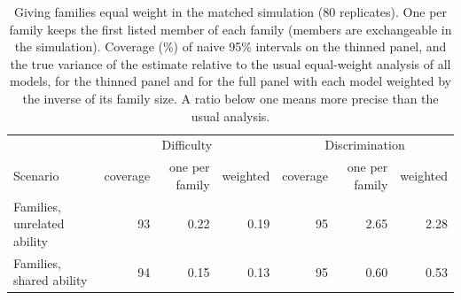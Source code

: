 \begin{table}[!htb]\centering\footnotesize\setlength{\tabcolsep}{3.5pt}
\caption{Giving families equal weight in the matched simulation (80 replicates). One per family keeps the first listed member of each family (members are exchangeable in the simulation). Coverage (\%) of naive 95\% intervals on the thinned panel, and the true variance of the estimate relative to the usual equal-weight analysis of all models, for the thinned panel and for the full panel with each model weighted by the inverse of its family size. A ratio below one means more precise than the usual analysis.}\label{tab:thin}
\begin{tabular}{l|rrr|rrr}
\toprule
 & \multicolumn{3}{c|}{Difficulty} & \multicolumn{3}{c}{Discrimination}\\
Scenario & coverage & one per family & weighted & coverage & one per family & weighted\\
\midrule
Families, unrelated ability & 93 & 0.22 & 0.19 & 95 & 2.65 & 2.28\\
Families, shared ability & 94 & 0.15 & 0.13 & 95 & 0.60 & 0.53\\
\bottomrule
\end{tabular}
\end{table}
